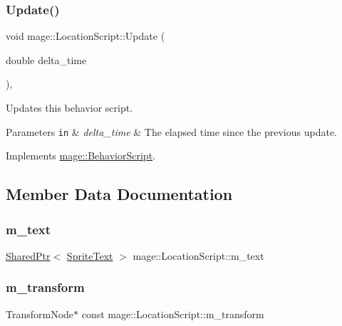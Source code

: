 \subsubsection{\texorpdfstring{Update()}{Update()}}
{\footnotesize\ttfamily void mage\+::\+Location\+Script\+::\+Update (\begin{DoxyParamCaption}\item[{double}]{delta\+\_\+time }\end{DoxyParamCaption})\hspace{0.3cm}{\ttfamily [override]}, {\ttfamily [virtual]}}

Updates this behavior script.


\begin{DoxyParams}[1]{Parameters}
\mbox{\tt in}  & {\em delta\+\_\+time} & The elapsed time since the previous update. \\
\hline
\end{DoxyParams}


Implements \hyperlink{classmage_1_1_behavior_script_a905b6c83640cb91d19fecab3435f6feb}{mage\+::\+Behavior\+Script}.



\subsection{Member Data Documentation}
\hypertarget{classmage_1_1_location_script_ac5c7ada3b364d85888686abf20cd6463}{}\label{classmage_1_1_location_script_ac5c7ada3b364d85888686abf20cd6463} 
\subsubsection{\texorpdfstring{m\+\_\+text}{m\_text}}
{\footnotesize\ttfamily \hyperlink{namespacemage_a1e01ae66713838a7a67d30e44c67703e}{Shared\+Ptr}$<$ \hyperlink{classmage_1_1_sprite_text}{Sprite\+Text} $>$ mage\+::\+Location\+Script\+::m\+\_\+text\hspace{0.3cm}{\ttfamily [private]}}

\hypertarget{classmage_1_1_location_script_a6e4ed33a4d2031c8726731c64b8200c9}{}\label{classmage_1_1_location_script_a6e4ed33a4d2031c8726731c64b8200c9} 
\subsubsection{\texorpdfstring{m\+\_\+transform}{m\_transform}}
{\footnotesize\ttfamily Transform\+Node$\ast$ const mage\+::\+Location\+Script\+::m\+\_\+transform\hspace{0.3cm}{\ttfamily [private]}}

